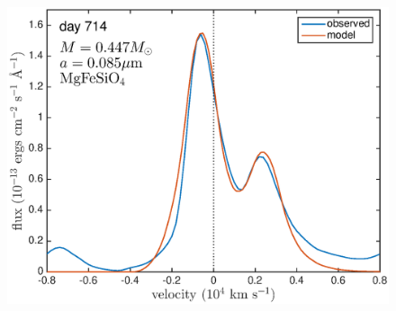 \documentclass[useAMS,usenatbib,usegraphicx]{mnras}
\begin{document}
\begin{figure}
\includegraphics[trim =25 0 0 0,clip=true,scale=0.25]{silicates_take2/OI/MgFeSiO4_Dwek}


\end{figure}
\end{document}
